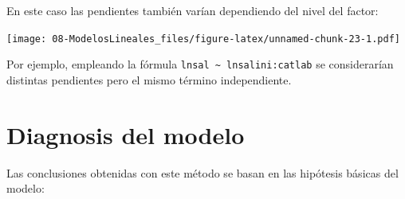 \documentclass[
]{book}
\newenvironment{Shaded}{\begin{snugshade}}{\end{snugshade}}
\newcommand{\AttributeTok}[1]{\textcolor[rgb]{0.77,0.63,0.00}{#1}}
\newcommand{\DecValTok}[1]{\textcolor[rgb]{0.00,0.00,0.81}{#1}}
\newcommand{\FunctionTok}[1]{\textcolor[rgb]{0.00,0.00,0.00}{#1}}
\newcommand{\NormalTok}[1]{#1}
\newcommand{\OtherTok}[1]{\textcolor[rgb]{0.56,0.35,0.01}{#1}}
\newcommand{\SpecialCharTok}[1]{\textcolor[rgb]{0.00,0.00,0.00}{#1}}
\newcommand{\StringTok}[1]{\textcolor[rgb]{0.31,0.60,0.02}{#1}}
\theoremstyle{break}
\theoremstyle{nonumberplain}
\begin{document}
En este caso las pendientes también varían dependiendo del nivel del factor:

\begin{Shaded}
\end{Shaded}

\texttt{[image: 08-ModelosLineales\_files/figure-latex/unnamed-chunk-23-1.pdf]}

Por ejemplo, empleando la fórmula \texttt{lnsal\ \textasciitilde{}\ lnsalini:catlab} se considerarían distintas pendientes pero el mismo término independiente.

\hypertarget{diagnosis-del-modelo}{%
\section{Diagnosis del modelo}\label{diagnosis-del-modelo}}

Las conclusiones obtenidas con este método se basan en las hipótesis básicas del modelo:
\end{document}
